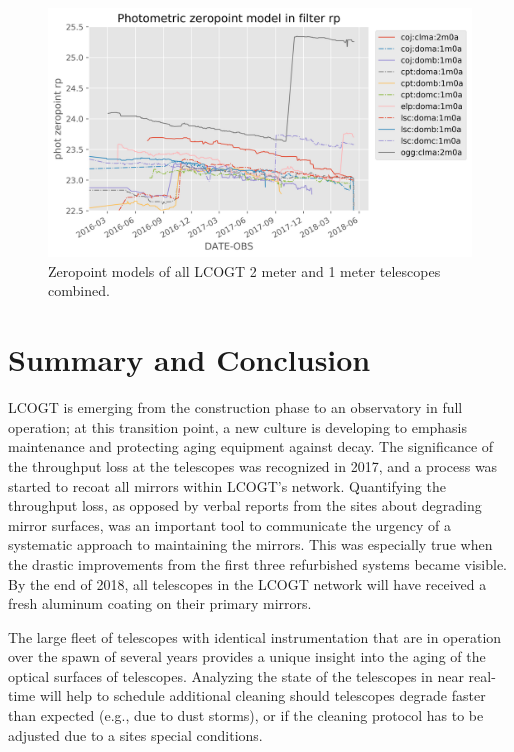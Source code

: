 \documentclass[]{spieman}
\begin{document}
\begin{figure}
\includegraphics[width=\textwidth]{images/allmodels__2m0a_1m0a__rp.png}
\caption{\label{fig_alltelescopes} Zeropoint models of all LCOGT 2 meter and 1 meter telescopes combined. }
\end{figure}


\section{Summary and Conclusion}
LCOGT is emerging from the construction phase to an observatory in full operation; at this
transition point, a new culture is developing to emphasis maintenance and protecting aging equipment
against decay. The significance of the throughput loss at the telescopes was recognized in 2017, and
a process was started to recoat all mirrors within LCOGT's network. Quantifying the throughput loss,
as opposed by verbal reports from the sites about degrading mirror surfaces, was an important tool
to communicate the urgency of a systematic approach to maintaining the mirrors. This was especially
true when the drastic improvements from the first three refurbished systems became visible. By the
end of 2018, all telescopes in the LCOGT network will have received a fresh aluminum coating on
their primary mirrors.

The large fleet of telescopes with identical instrumentation that are in operation over the spawn 
of several years provides a unique insight into the aging of the optical surfaces of  
telescopes. Analyzing the state of the telescopes in near real-time will help to schedule 
additional cleaning should telescopes degrade faster than expected (e.g., due to dust storms), or 
if the cleaning protocol has to be adjusted due to a sites special conditions.     
\end{document}
